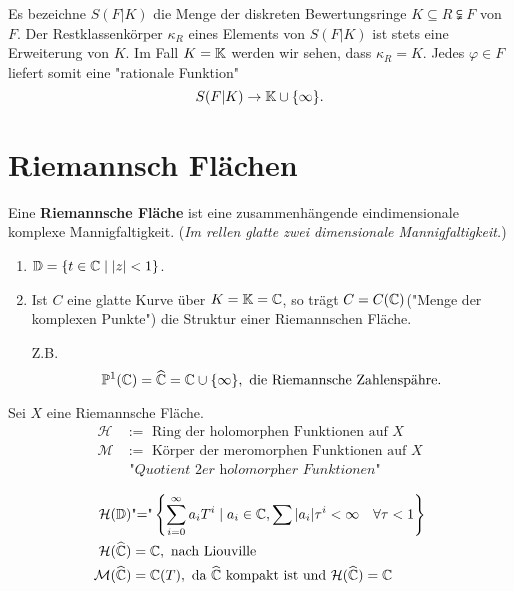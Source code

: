 \begin{bemerkungnr}
    Es bezeichne $S(F|K)$ die Menge der diskreten Bewertungsringe $K \subseteq R \subsetneqq F$ von $F$.
    Der Restklassenkörper $\kappa_R$ eines Elements von $S(F|K)$ ist stets eine Erweiterung von $K$.
    Im Fall $K = \mathbb{K}$ werden wir sehen, dass $\kappa_R = K$. Jedes $\varphi \in F$ liefert somit eine "rationale Funktion"
    $$ S(F|K) \to \mathbb{K} \cup \{\infty\}. $$
\end{bemerkungnr}

\section{Riemannsch Flächen}
\begin{definition}
    Eine \textbf{Riemannsche Fläche} ist eine zusammenhängende eindimensionale komplexe Mannigfaltigkeit.
    (\textit{Im rellen glatte zwei dimensionale Mannigfaltigkeit.})
\end{definition}

\begin{beispiel}
    \begin{enumerate}[label=\alph*.)]
        \item $\mathbb{D} = \{t \in \mathbb{C} \mid |z| < 1\}$.
        \item Ist $C$ eine glatte Kurve über $K = \mathbb{K} = \mathbb{C}$, so trägt $C = C(\mathbb{C})$("Menge der komplexen Punkte")
        die Struktur einer Riemannschen Fläche.

        Z.B. $$ \mathbb{P}^1(\mathbb{C}) = \widehat{\mathbb{C}} = \mathbb{C} \cup \{\infty\}, \text{ die Riemannsche Zahlenspähre.}$$
    \end{enumerate}
\end{beispiel}

\begin{definition}
    Sei $X$ eine Riemannsche Fläche.
    \begin{align*}
        \mathcal{H} &:= \text{ Ring der holomorphen Funktionen auf }X\\
        \mathcal{M} &:= \text{ Körper der meromorphen Funktionen auf }X \\
        &\textit{ "Quotient 2er holomorpher Funktionen"}
    \end{align*}
\end{definition}

\begin{beispiel}
    \begin{align*}
        \mathcal{H}(\mathbb{D}) & \text{"="} \left\{\sum\limits_{i=0}^\infty a_i T^i \mid a_i \in \mathbb{C}, 
            \sum|a_i|\tau^i < \infty \quad \forall \tau < 1\right\}\\
        \mathcal{H}(\widehat{\mathbb{C}}) & = \mathbb{C}, \text{ nach Liouville}\\
        \mathcal{M}(\widehat{\mathbb{C}}) & = \mathbb{C}(T), \text{ da } \widehat{\mathbb{C}} \text{ kompakt ist und }
            \mathcal{H}(\widehat{\mathbb{C}}) = \mathbb{C}
    \end{align*}
\end{beispiel}

